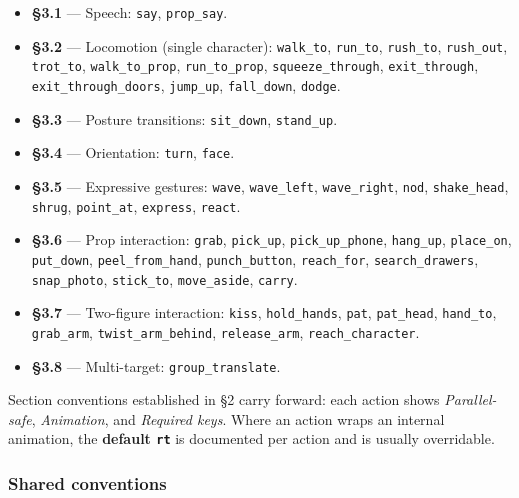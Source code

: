\documentclass[
  11pt,
]{book}
\providecommand{\tightlist}{%
  \setlength{\itemsep}{0pt}\setlength{\parskip}{0pt}}
\begin{document}
\begin{itemize}
\tightlist
\item
  \textbf{§3.1} --- Speech: \texttt{say}, \texttt{prop\_say}.
\item
  \textbf{§3.2} --- Locomotion (single character): \texttt{walk\_to},
  \texttt{run\_to}, \texttt{rush\_to}, \texttt{rush\_out},
  \texttt{trot\_to}, \texttt{walk\_to\_prop}, \texttt{run\_to\_prop},
  \texttt{squeeze\_through}, \texttt{exit\_through},
  \texttt{exit\_through\_doors}, \texttt{jump\_up}, \texttt{fall\_down},
  \texttt{dodge}.
\item
  \textbf{§3.3} --- Posture transitions: \texttt{sit\_down},
  \texttt{stand\_up}.
\item
  \textbf{§3.4} --- Orientation: \texttt{turn}, \texttt{face}.
\item
  \textbf{§3.5} --- Expressive gestures: \texttt{wave},
  \texttt{wave\_left}, \texttt{wave\_right}, \texttt{nod},
  \texttt{shake\_head}, \texttt{shrug}, \texttt{point\_at},
  \texttt{express}, \texttt{react}.
\item
  \textbf{§3.6} --- Prop interaction: \texttt{grab}, \texttt{pick\_up},
  \texttt{pick\_up\_phone}, \texttt{hang\_up}, \texttt{place\_on},
  \texttt{put\_down}, \texttt{peel\_from\_hand}, \texttt{punch\_button},
  \texttt{reach\_for}, \texttt{search\_drawers}, \texttt{snap\_photo},
  \texttt{stick\_to}, \texttt{move\_aside}, \texttt{carry}.
\item
  \textbf{§3.7} --- Two-figure interaction: \texttt{kiss},
  \texttt{hold\_hands}, \texttt{pat}, \texttt{pat\_head},
  \texttt{hand\_to}, \texttt{grab\_arm}, \texttt{twist\_arm\_behind},
  \texttt{release\_arm}, \texttt{reach\_character}.
\item
  \textbf{§3.8} --- Multi-target: \texttt{group\_translate}.
\end{itemize}

Section conventions established in §2 carry forward: each action shows
\emph{Parallel-safe}, \emph{Animation}, and \emph{Required keys}. Where
an action wraps an internal animation, the \textbf{default \texttt{rt}}
is documented per action and is usually overridable.

\subsubsection{Shared conventions}\label{shared-conventions}
\end{document}
